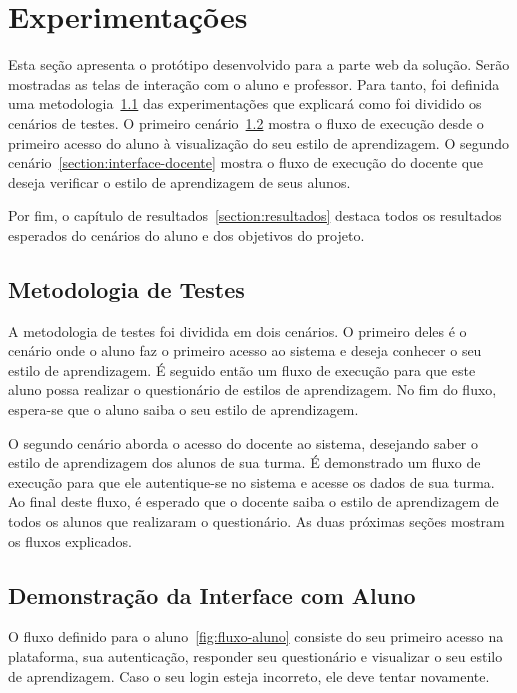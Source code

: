 \chapter{Experimentações}

Esta seção apresenta o protótipo desenvolvido para a parte web da solução. Serão mostradas as telas de interação com o aluno e professor. Para tanto, foi definida uma metodologia~\ref{section:metodologia-testes} das experimentações que explicará como foi dividido os cenários de testes.
O primeiro cenário~\ref{section:interface-aluno} mostra o fluxo de execução desde o primeiro acesso do aluno à visualização do seu estilo de aprendizagem. O segundo cenário~\ref{section:interface-docente} mostra o fluxo de execução do docente que deseja verificar o estilo de aprendizagem de seus alunos.

Por fim, o capítulo de resultados~\ref{section:resultados} destaca todos os resultados esperados do cenários do aluno e dos objetivos do projeto.

\section{Metodologia de Testes}\label{section:metodologia-testes}

A metodologia de testes foi dividida em dois cenários. O primeiro deles é o cenário onde o aluno faz o primeiro acesso ao sistema e deseja conhecer o seu estilo de aprendizagem. É seguido então um fluxo de execução para que este aluno possa realizar o questionário de estilos de aprendizagem. No fim do fluxo, espera-se que o aluno saiba o seu estilo de aprendizagem.

O segundo cenário aborda o acesso do docente ao sistema, desejando saber o estilo de aprendizagem dos alunos de sua turma. É demonstrado um fluxo de execução para que ele autentique-se no sistema e acesse os dados de sua turma. Ao final deste fluxo, é esperado que o docente saiba o estilo de aprendizagem de todos os alunos que realizaram o questionário.
As duas próximas seções mostram os fluxos explicados.

\section{Demonstração da Interface com Aluno}\label{section:interface-aluno}
O fluxo definido para o aluno~\ref{fig:fluxo-aluno} consiste do seu primeiro acesso na plataforma, sua autenticação, responder seu questionário e visualizar o seu estilo de aprendizagem. Caso o seu login esteja incorreto, ele deve tentar novamente.

